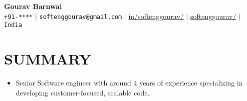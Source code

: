 \documentclass[letterpaper,11pt]{article}
\newcommand{\resumeSubHeadingListStart}{\begin{itemize}[leftmargin=0in, label={}]}
\newcommand{\resumeSubHeadingListEnd}{\end{itemize}}
\newcommand{\resumeItem}[1]{
    \item\small{
            {#1 \vspace{-1pt}}
    }
}
\begin{document}
\begin{center}
\textbf{\Huge Gourav Barnwal} \\ \vspace{5pt}
\small \faPhone* \texttt{+91-****} \hspace{1pt} $|$
\hspace{1pt} \faEnvelope \hspace{2pt} \texttt{softenggourav@gmail.com} \hspace{1pt} $|$
\hspace{1pt} \faLinkedin \hspace{2pt} \href{https://www.linkedin.com/in/softenggourav/}{in/softenggourav/} $|$
\hspace{1pt} \faGithub \hspace{2pt} \href{https://github.com/softenggourav}{softenggourav/} $|$
\hspace{1pt} \faMapMarker* \hspace{2pt}\texttt{India}
\\ \vspace{-3pt}
\end{center}
\section{SUMMARY}
\resumeSubHeadingListStart
\resumeItem{Senior Software engineer with around 4 years of experience specializing in developing customer-focused, scalable code.}
\resumeSubHeadingListEnd
\end{document}
